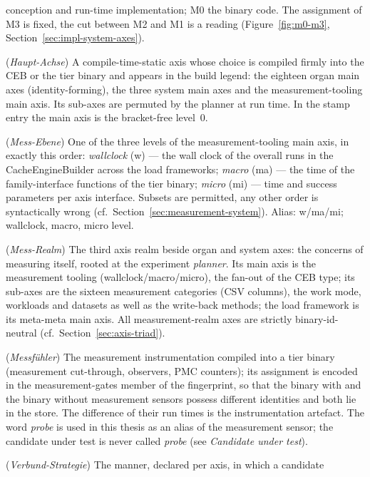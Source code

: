 \begin{description}
  conception and run-time implementation; M0 the binary code. The assignment of M3 is fixed, the
  cut between M2 and M1 is a reading (Figure~\ref{fig:m0-m3}, Section~\ref{sec:impl-system-axes}).
  \item[Main axis] (\emph{Haupt-Achse}) A compile-time-static axis whose choice is compiled firmly
  into the CEB or the tier binary and appears in the build legend: the eighteen organ main axes
  (identity-forming), the three system main axes and the measurement-tooling main axis. Its
  sub-axes are permuted by the planner at run time. In the stamp entry the main axis is the
  bracket-free level~0.
  \item[Measurement level] (\emph{Mess-Ebene}) One of the three levels of the measurement-tooling
  main axis, in exactly this order: \emph{wallclock} (w) --- the wall clock of the overall runs in
  the CacheEngineBuilder across the load frameworks; \emph{macro} (ma) --- the time of the
  family-interface functions of the tier binary; \emph{micro} (mi) --- time and success parameters
  per axis interface. Subsets are permitted, any other order is syntactically wrong
  (cf.\ Section~\ref{sec:measurement-system}). Alias: w/ma/mi; wallclock, macro, micro level.
  \item[Measurement realm] (\emph{Mess-Realm}) The third axis realm beside organ and system axes:
  the concerns of measuring itself, rooted at the experiment \emph{planner}. Its main axis is the
  measurement tooling (wallclock/macro/micro), the fan-out of the CEB type; its sub-axes are the
  sixteen measurement categories (CSV columns), the work mode, workloads and datasets as well as
  the write-back methods; the load framework is its meta-meta main axis. All measurement-realm
  axes are strictly binary-id-neutral (cf.\ Section~\ref{sec:axis-triad}).
  \item[Measurement sensor] (\emph{Messfühler}) The measurement instrumentation compiled into a
  tier binary (measurement cut-through, observers, PMC counters); its assignment is encoded in the
  measurement-gates member of the fingerprint, so that the binary with and the binary without
  measurement sensors possess different identities and both lie in the store. The difference of
  their run times is the instrumentation artefact. The word \emph{probe} is used in this thesis as
  an alias of the measurement sensor; the candidate under test is never called \emph{probe} (see
  \emph{Candidate under test}).
  \item[Merge strategy] (\emph{Verbund-Strategie}) The manner, declared per axis, in which a candidate

\end{description}
